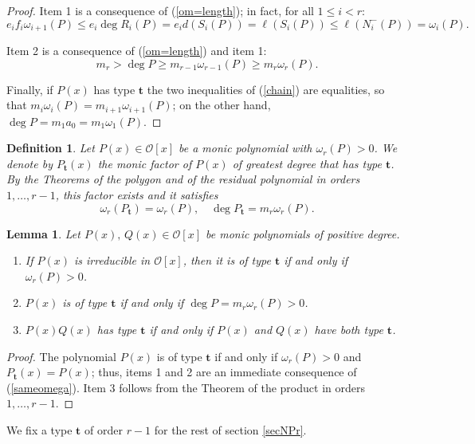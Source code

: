 \documentclass{amsart}
\newtheorem{lemma}[theorem]{Lemma}
\newtheorem{definition}[theorem]{Definition}
\def\op{\operatorname}
\def\dg{\op{deg}}
\def\om{\omega}
\def\oo{{\mathcal O}}
\def\ty{\mathbf{t}}
\def\zpx{\oo[x]}
\begin{document}
\begin{proof}Item 1 is a consequence of (\ref{om=length}); in fact, for all $1\le i<r$:
\begin{equation}\label{chain}
e_if_i\om_{i+1}(P)\le e_i\dg R_i(P)=e_id(S_i(P))=\ell(S_i(P))\le \ell(N_i^-(P))=\om_i(P).
\end{equation}

Item 2 is a consequence of (\ref{om=length}) and item 1:
$$m_r>\deg P\ge m_{r-1}\om_{r-1}(P)\ge m_r\om_r(P).$$
  
Finally, if $P(x)$ has type $\ty$ the two inequalities of (\ref{chain}) are equalities, so that $m_i\om_i(P)=m_{i+1}\om_{i+1}(P)$; on the other hand, $\dg P=m_1a_0=m_1\om_1(P)$.
\end{proof}

\begin{definition}\label{ppt}
Let $P(x)\in\zpx$ be a monic polynomial with $\om_r(P)>0$. We denote by $P_{\ty}(x)$ the monic factor of $P(x)$ of greatest degree that has type $\ty$. By the Theorems of the polygon and of the residual polynomial in orders $1,\dots,r-1$, this factor exists and it satisfies
\begin{equation}\label{sameomega}
 \om_r(P_\ty)=\om_r(P),\quad \dg P_{\ty}=m_r\om_r(P).
\end{equation}
\end{definition}

\begin{lemma}\label{factortype}
Let $P(x),\,Q(x)\in\zpx$ be monic polynomials of positive degree. 
\begin{enumerate}
\item If $P(x)$ is irreducible in $\zpx$, then it is of type $\ty$ if and only if $\om_r(P)>0$.
\item $P(x)$ is of type $\ty$  if and only if $\dg P=m_r\om_r(P)>0$. 
\item $P(x)Q(x)$ has type $\ty$ if and only if $P(x)$ and $Q(x)$ have both type $\ty$.
\end{enumerate}
\end{lemma}

\begin{proof}The polynomial $P(x)$ is of type $\ty$ if and only if $\om_r(P)>0$ and $P_\ty(x)=P(x)$; thus,
items 1 and 2 are an immediate consequence of (\ref{sameomega}). Item 3 follows from the Theorem of the product in orders $1,\dots,r-1$.
\end{proof}

We fix a type $\ty$ of order $r-1$ for  the rest of section \ref{secNPr}.
\end{document}

